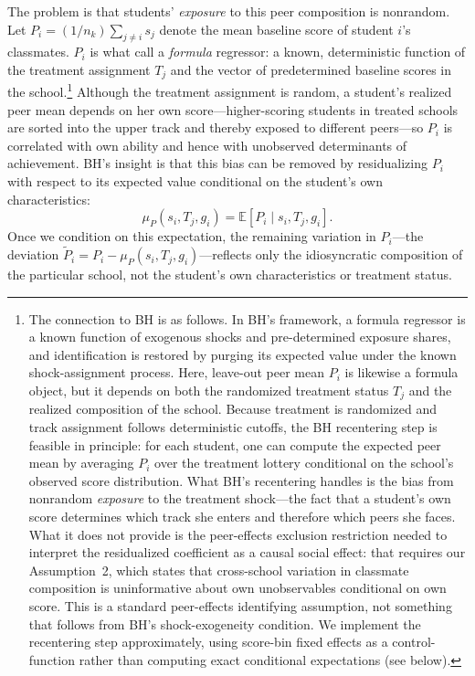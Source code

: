 \documentclass[11pt]{article}
\newcommand{\E}{\mathbb{E}}
\begin{document}
The problem is that students' \emph{exposure} to this peer composition is nonrandom. Let $P_i = (1/n_k) \sum_{j \neq i} s_j$ denote the mean baseline score of student $i$'s classmates. $P_i$ is what \citet{borusyak2023nonrandom} call a \emph{formula} regressor: a known, deterministic function of the treatment assignment $T_j$ and the vector of predetermined baseline scores in the school.\footnote{The connection to BH is as follows. In BH's framework, a formula regressor is a known function of exogenous shocks and pre-determined exposure shares, and identification is restored by purging its expected value under the known shock-assignment process. Here, leave-out peer mean $P_i$ is likewise a formula object, but it depends on both the randomized treatment status $T_j$ and the realized composition of the school. Because treatment is randomized and track assignment follows deterministic cutoffs, the BH recentering step is feasible in principle: for each student, one can compute the expected peer mean by averaging $P_i$ over the treatment lottery conditional on the school's observed score distribution. What BH's recentering handles is the bias from nonrandom \emph{exposure} to the treatment shock---the fact that a student's own score determines which track she enters and therefore which peers she faces. What it does not provide is the peer-effects exclusion restriction needed to interpret the residualized coefficient as a causal social effect: that requires our Assumption~2, which states that cross-school variation in classmate composition is uninformative about own unobservables conditional on own score. This is a standard peer-effects identifying assumption, not something that follows from BH's shock-exogeneity condition. We implement the recentering step approximately, using score-bin fixed effects as a control-function rather than computing exact conditional expectations (see below).} Although the treatment assignment is random, a student's realized peer mean depends on her own score---higher-scoring students in treated schools are sorted into the upper track and thereby exposed to different peers---so $P_i$ is correlated with own ability and hence with unobserved determinants of achievement. BH's insight is that this bias can be removed by residualizing $P_i$ with respect to its expected value conditional on the student's own characteristics:
\begin{equation}
\mu_P(s_i, T_j, g_i) = \E[P_i \mid s_i, T_j, g_i].
\end{equation}
Once we condition on this expectation, the remaining variation in $P_i$---the deviation $\tilde{P}_i = P_i - \mu_P(s_i, T_j, g_i)$---reflects only the idiosyncratic composition of the particular school, not the student's own characteristics or treatment status.
\end{document}
